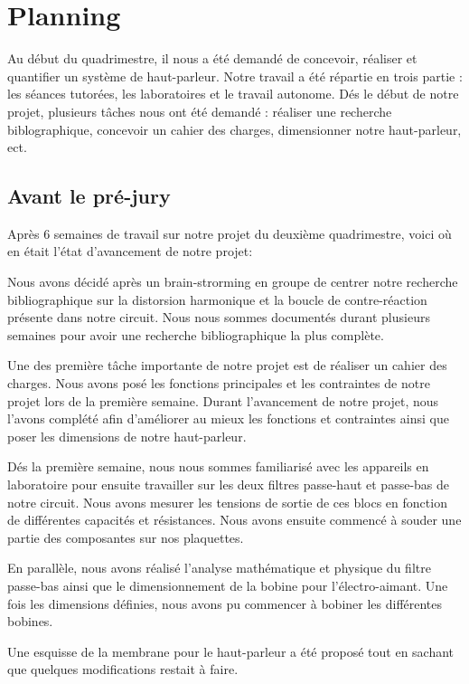 

\section{Planning}

Au début du quadrimestre, il nous a été demandé de concevoir, réaliser et quantifier un système de haut-parleur. Notre travail
a été répartie en trois partie : les séances tutorées, les laboratoires et le travail autonome. Dés le début de notre projet,
 plusieurs tâches nous ont été demandé : réaliser une recherche biblographique, concevoir un cahier des charges,
dimensionner notre haut-parleur, ect. 


\subsection{Avant le pré-jury}
Après 6 semaines de travail sur notre projet du deuxième quadrimestre, voici où en était l'état d'avancement 
de notre projet:

Nous avons décidé après un brain-strorming en groupe de centrer notre recherche bibliographique sur la distorsion harmonique 
et la boucle de contre-réaction présente dans notre circuit. Nous nous sommes documentés durant plusieurs semaines pour avoir
une recherche bibliographique la plus complète.

Une des première tâche importante de notre projet est de réaliser un cahier des charges. Nous avons posé les fonctions principales
et les contraintes de notre projet lors de la première semaine. Durant l'avancement de notre projet, nous l'avons complété
 afin d'améliorer au mieux les fonctions et contraintes ainsi que poser les dimensions de notre haut-parleur.

Dés la première semaine, nous nous sommes familiarisé avec les appareils en laboratoire pour ensuite travailler sur les
deux filtres passe-haut et passe-bas de notre circuit. Nous avons mesurer les tensions de sortie de ces blocs en fonction
de différentes capacités et résistances. Nous avons ensuite commencé à souder une partie des composantes sur nos plaquettes.

En parallèle, nous avons réalisé l'analyse mathématique et physique du filtre passe-bas ainsi que le dimensionnement de la bobine
pour l'électro-aimant. Une fois les dimensions définies, nous avons pu commencer à bobiner les différentes bobines.

Une esquisse de la membrane pour le haut-parleur a été proposé tout en sachant que quelques modifications restait à faire.

